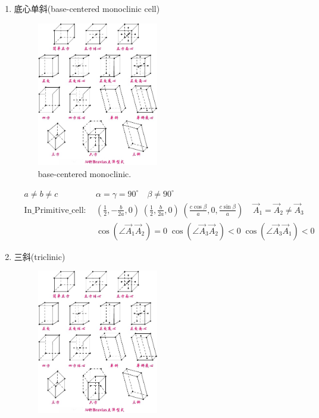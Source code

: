 \documentclass{article}      %
\begin{document}
\begin{enumerate}
		\item 底心单斜(\textrm{base-centered monoclinic cell})
\begin{figure}[h!]
\centering
\includegraphics[width=0.5\textwidth,viewport=375 185 500 330,clip]{Bravias.jpg}
\caption{\small base-centered monoclinic.}%
\label{Bravais:base-centered monoclinic}
\end{figure}
\begin{displaymath}
	\begin{aligned}
		&a\neq b\neq c &\alpha=\gamma=90^{\circ}\quad\beta\neq90^{\circ} \\
		&\mathrm{In\_Primitive\_cell}:~&(\frac12,-\frac{b}{2a},0)\;(\frac12,\frac{b}{2a},0)\;(\frac{c\cos\beta}{a},0,\frac{c\sin\beta}{a})\;\;\;\;\vec A_1=\vec A_2\neq\vec A_3\\
		& &\cos(\angle\vec A_1\vec A_2)=0\;\cos(\angle\vec A_3\vec A_2)<0\;\cos(\angle\vec A_3\vec A_1)<0
	\end{aligned}
\end{displaymath}
		\item 三斜(\textrm{triclinic})
\begin{figure}[h!]
\centering
\includegraphics[width=0.5\textwidth,viewport=290 30 450 185,clip]{Bravias.jpg}

\end{figure}
\end{enumerate}
\end{document}
